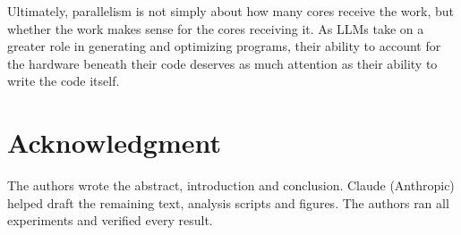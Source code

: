\documentclass[conference]{IEEEtran}
\begin{document}
Ultimately, parallelism is not simply about how many cores receive the work, but whether the work makes sense for the cores receiving it. As LLMs take on a greater role in generating and optimizing programs, their ability to account for the hardware beneath their code deserves as much attention as their ability to write the code itself.

\section*{Acknowledgment}
The authors wrote the abstract, introduction and conclusion. Claude (Anthropic) helped draft the remaining text, analysis scripts and figures. The authors ran all experiments and verified every result.



\end{document}
